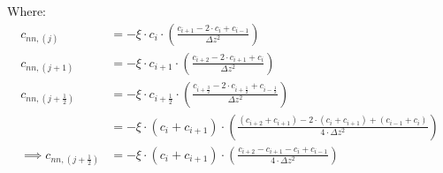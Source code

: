 \documentclass{article}
\begin{document}
Where:
\begin{align*}
	c_{nn, (j)}                      & =  -\xi\cdot c_i\cdot\left(\frac{c_{i+1}-2\cdot c_i + c_{i-1}}{\Delta z^2}\right)                                                       \\
	c_{nn, (j+1)}                    & =  -\xi\cdot c_{i+1}\cdot\left(\frac{c_{i+2}-2\cdot c_{i+1} + c_{i}}{\Delta z^2}\right)                                                 \\
	c_{nn, (j+\frac{1}{2})}          & =  -\xi\cdot c_{i+\frac{1}{2}}\cdot\left(\frac{c_{i+\frac{3}{2}}-2\cdot c_{i+\frac{1}{2}} + c_{i-\frac{1}{2}}}{\Delta z^2}\right)       \\
	                                 & =  -\xi\cdot (c_i + c_{i+1})\cdot\left(\frac{(c_{i+2} + c_{i+1})-2\cdot (c_{i} + c_{i+1}) + (c_{i-1} + c_{i})}{4\cdot\Delta z^2}\right) \\
	\implies c_{nn, (j+\frac{1}{2})} & = -\xi\cdot (c_{i} + c_{i+1})\cdot\left(\frac{c_{i+2} - c_{i+1}-c_{i} + c_{i-1}}{4\cdot\Delta z^2}\right)                               \\
\end{align*}
\end{document}
